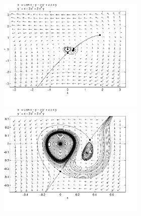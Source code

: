 \documentclass{ximera}
\begin{document}
\begin{computerExercise}
\begin{solution}
\begin{figure}[htb]
                       \centerline{%
                        \includegraphics[width=2.75in]{exfigure/8-4-5a.pdf}
			\includegraphics[width=2.75in]{exfigure/8-4-5a2.pdf}}
\end{figure}




\end{solution}
\end{computerExercise}
\end{document}
